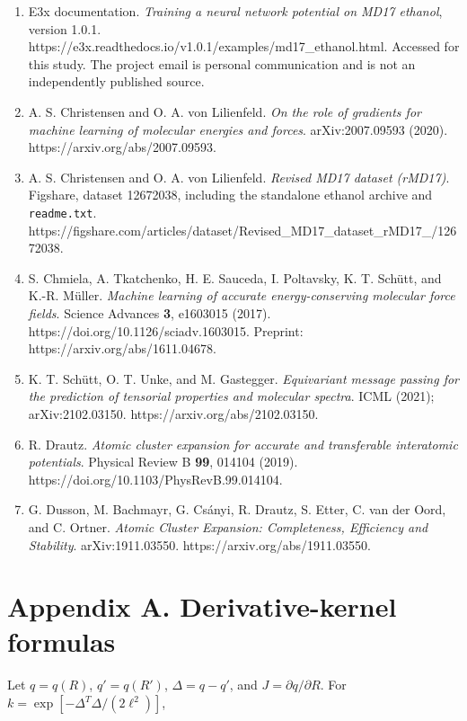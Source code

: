 \documentclass[
  11pt,
  a4paper,
]{article}
\providecommand{\tightlist}{%
  \setlength{\itemsep}{0pt}\setlength{\parskip}{0pt}}
\begin{document}
\begin{enumerate}
\def\labelenumi{\arabic{enumi}.}
\tightlist
\item
  E3x documentation. \emph{Training a neural network potential on MD17
  ethanol}, version 1.0.1.
  https://e3x.readthedocs.io/v1.0.1/examples/md17\_ethanol.html.
  Accessed for this study. The project email is personal communication
  and is not an independently published source.
\item
  A. S. Christensen and O. A. von Lilienfeld. \emph{On the role of
  gradients for machine learning of molecular energies and forces}.
  arXiv:2007.09593 (2020). https://arxiv.org/abs/2007.09593.
\item
  A. S. Christensen and O. A. von Lilienfeld. \emph{Revised MD17 dataset
  (rMD17)}. Figshare, dataset 12672038, including the standalone ethanol
  archive and \texttt{readme.txt}.
  https://figshare.com/articles/dataset/Revised\_MD17\_dataset\_rMD17\_/12672038.
\item
  S. Chmiela, A. Tkatchenko, H. E. Sauceda, I. Poltavsky, K. T. Schütt,
  and K.-R. Müller. \emph{Machine learning of accurate energy-conserving
  molecular force fields}. Science Advances \textbf{3}, e1603015 (2017).
  https://doi.org/10.1126/sciadv.1603015. Preprint:
  https://arxiv.org/abs/1611.04678.
\item
  K. T. Schütt, O. T. Unke, and M. Gastegger. \emph{Equivariant message
  passing for the prediction of tensorial properties and molecular
  spectra}. ICML (2021); arXiv:2102.03150.
  https://arxiv.org/abs/2102.03150.
\item
  R. Drautz. \emph{Atomic cluster expansion for accurate and
  transferable interatomic potentials}. Physical Review B \textbf{99},
  014104 (2019). https://doi.org/10.1103/PhysRevB.99.014104.
\item
  G. Dusson, M. Bachmayr, G. Csányi, R. Drautz, S. Etter, C. van der
  Oord, and C. Ortner. \emph{Atomic Cluster Expansion: Completeness,
  Efficiency and Stability}. arXiv:1911.03550.
  https://arxiv.org/abs/1911.03550.
\end{enumerate}

\hypertarget{appendix-a.-derivative-kernel-formulas}{%
\section{Appendix A. Derivative-kernel
formulas}\label{appendix-a.-derivative-kernel-formulas}}

Let \(q=q(R)\), \(q'=q(R')\), \(\Delta=q-q'\), and
\(J=\partial q/\partial R\). For \(k=\exp[-\Delta^T\Delta/(2\ell^2)]\),
\end{document}
